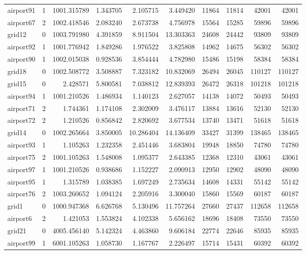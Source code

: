 \begin{longtable}{|l|r|r|r|r|r|r|r|r|r|}
airport91 & 1 & 1001.315789 & 1.343705 & 2.105715 & 3.449420 & 11864 & 11814 & 42001 & 42001 \\
airport67 & 2 & 1002.418546 & 2.083240 & 2.673738 & 4.756978 & 15564 & 15285 & 59896 & 59896 \\
grid12 & 0 & 1003.791980 & 4.391859 & 8.911504 & 13.303363 & 24608 & 24442 & 93809 & 93809 \\
airport92 & 1 & 1001.776942 & 1.849286 & 1.976522 & 3.825808 & 14962 & 14675 & 56302 & 56302 \\
airport90 & 1 & 1002.015038 & 0.928536 & 3.854444 & 4.782980 & 15486 & 15198 & 58384 & 58384 \\
grid18 & 0 & 1002.508772 & 3.508887 & 7.323182 & 10.832069 & 26494 & 26045 & 110127 & 110127 \\
grid15 & 0 & 2.428571 & 5.800581 & 7.038812 & 12.839393 & 26472 & 26318 & 101218 & 101218 \\
airport94 & 1 & 1001.210526 & 1.486934 & 1.140123 & 2.627057 & 14138 & 14072 & 50493 & 50493 \\
airport71 & 2 & 1.744361 & 1.174108 & 2.302009 & 3.476117 & 13884 & 13616 & 52130 & 52130 \\
airport72 & 2 & 1.210526 & 0.856842 & 2.820692 & 3.677534 & 13740 & 13471 & 51618 & 51618 \\
grid14 & 0 & 1002.265664 & 3.850005 & 10.286404 & 14.136409 & 33427 & 31399 & 138465 & 138465 \\
airport93 & 1 & 1.105263 & 1.232358 & 2.451446 & 3.683804 & 19948 & 18850 & 74780 & 74780 \\
airport75 & 2 & 1001.105263 & 1.548008 & 1.095377 & 2.643385 & 12368 & 12310 & 43061 & 43061 \\
airport97 & 1 & 1001.210526 & 0.938686 & 1.152227 & 2.090913 & 12950 & 12902 & 48090 & 48090 \\
airport95 & 1 & 1.315789 & 1.038385 & 1.697249 & 2.735634 & 14608 & 14331 & 55142 & 55142 \\
airport76 & 2 & 1003.260652 & 1.094124 & 2.205916 & 3.300040 & 15860 & 15569 & 60187 & 60187 \\
grid1 & 0 & 1000.947368 & 6.626768 & 5.130496 & 11.757264 & 27660 & 27437 & 112658 & 112658 \\
airport6 & 2 & 1.421053 & 1.553824 & 4.102338 & 5.656162 & 18696 & 18408 & 73550 & 73550 \\
grid21 & 0 & 4005.456140 & 5.142324 & 4.463860 & 9.606184 & 22774 & 22646 & 85935 & 85935 \\
airport99 & 1 & 6001.105263 & 1.058730 & 1.167767 & 2.226497 & 15714 & 15431 & 60392 & 60392 \\

\end{longtable}
